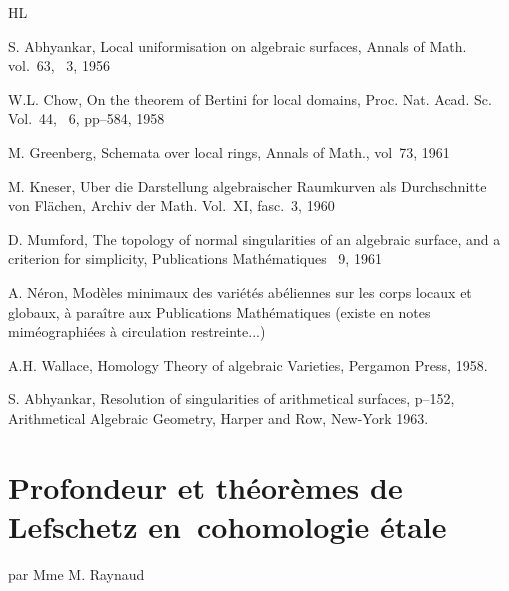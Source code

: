\begin{thebibliography}{HL}\pageoriginale\label{XIII.7}

S. Abhyankar, Local uniformisation on algebraic surfaces, Annals of Math. vol.~63, \No~3, 1956

W.L. Chow, On the theorem of Bertini for local domains, Proc. Nat. Acad. Sc. Vol.~44, \No~6, pp--584, 1958

M. Greenberg, Schemata over local rings, Annals of Math., vol~73, 1961

M. Kneser, Uber die Darstellung algebraischer Raumkurven als Durchschnitte von Fl\"achen, Archiv der Math. Vol.~XI, fasc.~3, 1960

D. Mumford, The topology of normal singularities of an algebraic surface, and a criterion for simplicity, Publications Math\'ematiques \No~9, 1961

A. N\'eron, Mod\`eles minimaux des vari\'et\'es ab\'eliennes sur les corps locaux et globaux, \`a para\^itre aux Publications Math\'ematiques (existe en notes mim\'eographi\'ees \`a circulation restreinte...)

A.H. Wallace, Homology Theory of algebraic Varieties, Pergamon Press, 1958.

S. Abhyankar, Resolution of singularities of arithmetical surfaces, p--152, Arithmetical Algebraic Geometry, Harper and Row, New-York 1963.


\end{thebibliography}

\chapter[Profondeur et th\'eor\`emes de Lefschetz]
{Profondeur et th\'eor\`emes de Lefschetz en~cohomologie \'etale} \label{XIV}
\begin{center}
par Mme M. Raynaud
\end{center}

